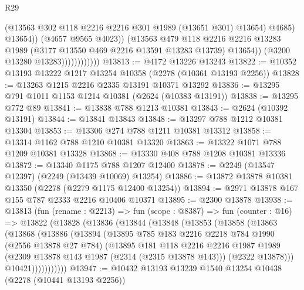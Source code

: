 \begin{lexlean}{R29}
\begin{coremodule}
                                    (@13563 @302 @118 @2216 @2216 @301 @1989 (@13651 @301) @13654)
                                    @4685)
                                  @13654))
                              (@4657 @9565 @4023))
                            (@13563
                              @479
                              @118
                              @2216
                              @2216
                              @13283
                              @1989
                              (@3177 @13550 @469 @2216 @13591 @13283 @13739)
                              @13654))
                          (@3200 @13280 @13283))))))))))))
@13813 := @4172 @13226 @13243
@13822 := @10352 @13193 @13222 @1217 @13254 @10358 (@2278 (@10361 @13193 @2256))
@13828 := @13263 @1215 @2216 @2335 @13191 @10371 @13292
@13836 := @13295 @791 @1011 @1153 @1214 @10381 (@2624 (@10383 @13191))
@13838 := @13295 @772 @89
@13841 := @13838 @788 @1213 @10381
@13843 := @2624 (@10392 @13191)
@13844 := @13841 @13843
@13848 := @13297 @788 @1212 @10381 @13304
@13853 := @13306 @274 @788 @1211 @10381 @13312
@13858 := @13314 @1162 @788 @1210 @10381 @13320
@13863 := @13322 @1071 @788 @1209 @10381 @13328
@13868 := @13330 @408 @788 @1208 @10381 @13336
@13872 := @13340 @1175 @788 @1207 @12400
@13878 := @2249 (@13547 @12397) (@2249 (@13439 @10069) @13254)
@13886 := @13872 @13878 @10381 @13350 (@2278 (@2279 @1175 @12400 @13254))
@13894 := @2971 @13878 @167 @155 @787 @2333 @2216 @10406 @10371
@13895 := @2300 @13878
@13938 := @13813
    (fun (rename : @2213) =>
    fun (scope : @8387) =>
    fun (counter : @16) =>
    @13822
      (@13828
        (@13836
          (@13844
            (@13848
              (@13853
                (@13858
                  (@13863
                    (@13868
                      (@13886
                        (@13894
                          (@13895
                            @785
                            @183
                            @2216
                            @2218
                            @784
                            @1990
                            (@2556 @13878 @27 @784)
                            (@13895
                              @181
                              @118
                              @2216
                              @2216
                              @1987
                              @1989
                              (@2309 @13878 @143 @1987 (@2314 (@2315 @13878 @143)))
                              (@2322 @13878)))
                          @10421)))))))))))
@13947 := @10432 @13193 @13239 @1540 @13254 @10438 (@2278 (@10441 @13193 @2256))

\end{coremodule}
\end{lexlean}
